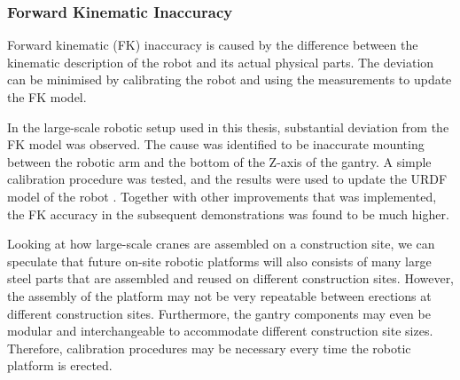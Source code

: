 \subsubsection{Forward Kinematic Inaccuracy}
\label{subsubsection:new_hypo_forward_kinematic_inaccuracy}

Forward kinematic (FK) inaccuracy is caused by the difference between the kinematic description of the robot and its actual physical parts. The deviation can be minimised by calibrating the robot \parencite{chen-gangReviewKinematicsCalibration2014, mooringFundamentalsManipulatorCalibration1991} and using the measurements to update the FK model.

In the large-scale robotic setup used in this thesis, substantial deviation from the FK model was observed. The cause was identified to be inaccurate mounting between the robotic arm and the bottom of the Z-axis of the gantry. A simple calibration procedure was tested, and the results were used to update the URDF model of the robot . Together with other improvements that was implemented, the FK accuracy in the subsequent demonstrations was found to be much higher.

Looking at how large-scale cranes are assembled on a construction site, we can speculate that future on-site robotic platforms will also consists of many large steel parts that are assembled and reused on different construction sites. However, the assembly of the platform may not be very repeatable between erections at different construction sites. Furthermore, the gantry components may even be modular and interchangeable to accommodate different construction site sizes. Therefore, calibration procedures may be necessary every time the robotic platform is erected.

